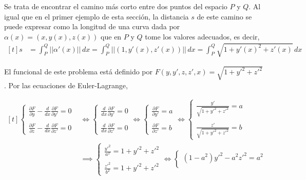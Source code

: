 \documentclass[12pt]{report}
\begin{document}
\begin{example}
Se trata de encontrar el camino más corto entre dos puntos del espacio $P$ y $Q$. Al igual que en el primer ejemplo de esta sección, la distancia $s$ de este camino se puede expresar como la longitud de una curva dada por $\alpha(x) = (x,y(x),z(x))$ que en $P$ y $Q$ tome los valores adecuados, es decir,
\[
\begin{aligned}[t]
s &= \int_P^Q ||\alpha'(x)|| \, dx = \int_P^Q ||(1, y'(x), z'(x))|| \, dx = \int_P^Q \sqrt{1+y'(x)^2+z'(x)} \, dx
\end{aligned}
\]

El funcional de este problema está definido por $F(y,y',z,z',x) = \sqrt{1+y'^2+z'^2}$. Por las ecuaciones de Euler-Lagrange,

\[
\begin{aligned}[t]
\begin{cases}
\displaystyle \frac{\partial F}{\partial y}-\frac{d}{dx}\frac{\partial F}{\partial y'} = 0 \\
\\
\displaystyle \frac{\partial F}{\partial z}-\frac{d}{dx}\frac{\partial F}{\partial z'} = 0
\end{cases}
&\iff
\begin{cases}
\displaystyle \frac{d}{dx}\frac{\partial F}{\partial y'} = 0 \\
\\
\displaystyle \frac{d}{dx}\frac{\partial F}{\partial z'} = 0
\end{cases}
\iff
\begin{cases}
\displaystyle \frac{\partial F}{\partial y'} = a \\
\\
\displaystyle \frac{\partial F}{\partial z'} = b
\end{cases}
\iff
\begin{cases}
\displaystyle \frac{y'}{\sqrt{1+y'^2+z'^2}} = a \\
\\
\displaystyle \frac{z'}{\sqrt{1+y'^2+z'^2}} = b
\end{cases}
\\
&\implies
\begin{cases}
\displaystyle \frac{y'^2}{a^2} = 1+y'^2+z'^2 \\
\\
\displaystyle \frac{z'^2}{b^2} = 1+y'^2+z'^2
\end{cases}
\iff
\begin{cases}
(1-a^2)y'^2 -a^2z'^2= a^2 \\

\end{cases}
\end{aligned}\]
\end{example}
\end{document}
